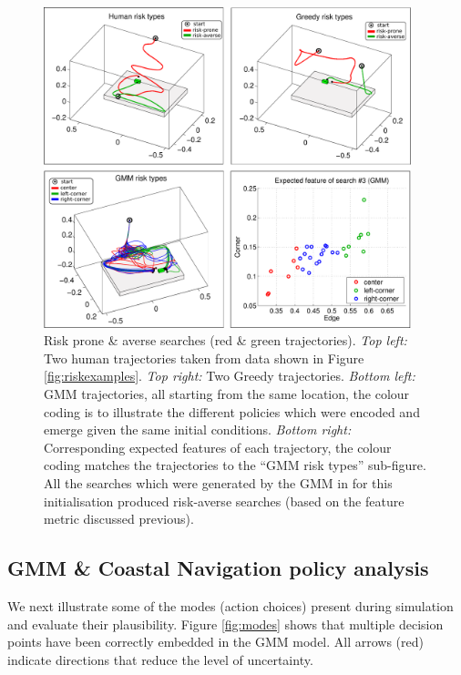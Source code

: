 \begin{figure}[h!]
 \centering
  \includegraphics[width=0.95\textwidth]{./ch3-Search/Figures/Figure8}
  \caption{Risk prone \& averse searches (red \& green trajectories). \textit{Top left:}
  Two human trajectories taken from data shown in Figure \ref{fig:riskexamples}. 
  \textit{Top right:} Two Greedy trajectories. \textit{Bottom left:} GMM trajectories, all starting from the same location, the
  colour coding is to illustrate the different policies which were encoded and emerge given the same initial conditions. 
  \textit{Bottom right:} Corresponding expected features of each trajectory, the colour coding matches the trajectories 
  to the ``GMM risk types'' sub-figure. All the searches which were generated by the GMM in for this initialisation produced
  risk-averse searches (based on the feature metric discussed previous).}
  \label{fig:risk_examples}
\end{figure}


\subsection{GMM \& Coastal Navigation policy analysis}\label{sub:policy_analysis}

We next illustrate some of the modes (action choices) present during simulation and evaluate their 
plausibility. Figure \ref{fig:modes} shows that multiple decision points have been correctly embedded in the GMM model. All
arrows (red) indicate directions that reduce the level of uncertainty. 

